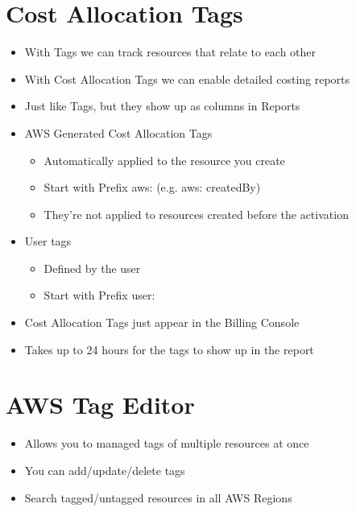 \section{Cost Allocation Tags}

\begin{itemize}
    \item With Tags we can track resources that relate to each other
    \item With Cost Allocation Tags we can enable detailed costing reports
    \item Just like Tags, but they show up as columns in Reports
    \item AWS Generated Cost Allocation Tags
    \begin{itemize}
        \item Automatically applied to the resource you create
        \item Start with Prefix aws: (e.g. aws: createdBy)
        \item They're not applied to resources created before the activation
    \end{itemize}
    \item User tags
    \begin{itemize}
        \item Defined by the user
        \item Start with Prefix user:
    \end{itemize}
    \item Cost Allocation Tags just appear in the Billing Console
    \item Takes up to 24 hours for the tags to show up in the report
\end{itemize}


\section{AWS Tag Editor}
\begin{itemize}
    \item Allows you to managed tags of multiple resources at once
    \item You can add/update/delete tags
    \item Search tagged/untagged resources in all AWS Regions
\end{itemize}


